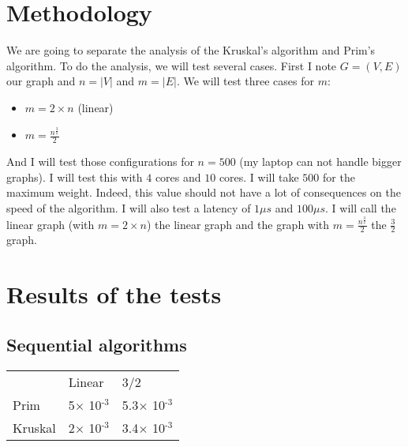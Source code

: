 \documentclass[
10pt, %
a4paper, %
oneside, %
headinclude,footinclude, %
BCOR5mm, %
]{scrartcl}
\begin{document}

\newpage %


\section{Methodology}

We are going to separate the analysis of the Kruskal's algorithm and
Prim's algorithm. To do the analysis, we will test several
cases. First I note $G=(V, E)$ our graph and $n=|V|$ and $m=|E|$. We
will test three cases for $m$:
\begin{itemize}
\item $m=2\times n$ (linear)
\item $m=\frac{n^{\frac{3}{2}}}{2}$
\end{itemize}

And I will test those configurations for $n=500$ (my
laptop can not handle bigger graphs).
I will test this with $4$ cores and $10$ cores. I will take $500$ for
the maximum weight. Indeed, this value should not have a lot of
consequences on the speed of the algorithm. I will also test a latency
of $1\mu s$ and $100\mu s$. I will call the linear graph (with
$m=2\times n$) the linear graph and the graph with $m =
\frac{n^{\frac{3}{2}}}{2}$ the $\frac{3}{2}$ graph.

\section{Results of the tests}

\subsection{Sequential algorithms}
\begin{center}
  \begin{tabular}{lll}
    & Linear & 3/2\\
    Prim & 5$\times$ 10\(^{\text{-3}}\) & 5.3$\times$ 10\(^{\text{-3}}\)\\
    Kruskal & 2$\times$ 10\(^{\text{-3}}\) & 3.4$\times$ 10\(^{\text{-3}}\)\\
  \end{tabular}
\end{center}
\end{document}
